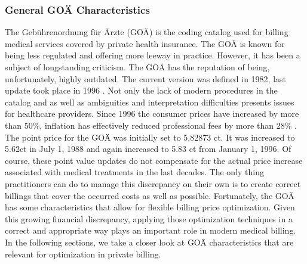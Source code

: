 \subsubsection{General GOÄ Characteristics}
The Gebührenordnung für Ärzte (GOÄ) is the coding catalog used for billing medical services covered by private health insurance.
The GOÄ is known for being less regulated and offering more leeway in practice.
However, it has been a subject of longstanding criticism.
The GOÄ has the reputation of being, unfortunately, highly outdated.
The current version was defined in 1982, last update took place in 1996 \cite{heller2015goa}.
Not only the lack of modern procedures in the catalog and as well as ambiguities and interpretation difficulties presents issues for healthcare providers.
Since 1996 the consumer prices have increased by more than 50\%, inflation has effectively reduced professional fees by more than 28\% \cite{schmitzgoa}.
The point price for the GOÄ was initially set to 5.82873 ct.
It was increased to 5.62ct in July 1, 1988 and again increased to 5.83 ct from January 1, 1996\cite{hermanns2013bemessung}.
Of course, these point value updates do not compensate for the actual price increase associated with medical treatments in the last decades.
The only thing practitioners can do to manage this discrepancy on their own is to create correct billings that cover the occurred costs as well as possible.
Fortunately, the GOÄ has some characteristics that allow for flexible billing price optimization.
Given this growing financial discrepancy, applying those optimization techniques in a correct and appropriate way plays an important role in modern medical billing.
In the following sections, we take a closer look at GOÄ characteristics that are relevant for optimization in private billing.


